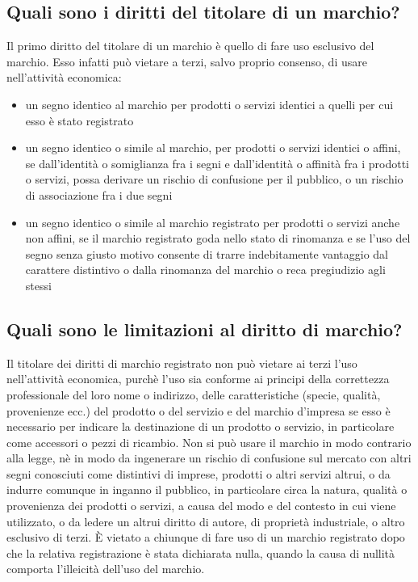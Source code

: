 \subsection{Quali sono i diritti del titolare di un marchio?}
Il primo diritto del titolare di un marchio è quello di fare uso esclusivo del marchio. Esso infatti può vietare a terzi, salvo
proprio consenso, di usare nell'attività economica:
\begin{itemize}
    \item un segno identico al marchio per prodotti o servizi identici a quelli per cui esso è stato registrato
    \item un segno identico o simile al marchio, per prodotti o servizi identici o affini, se dall'identità o somiglianza
    fra i segni e dall'identità o affinità fra i prodotti o servizi, possa derivare un rischio di confusione per il pubblico,
    o un rischio di associazione fra i due segni
    \item un segno identico o simile al marchio registrato per prodotti o servizi anche non affini, se il marchio registrato
    goda nello stato di rinomanza e se l'uso del segno senza giusto motivo consente di trarre indebitamente vantaggio dal carattere
    distintivo o dalla rinomanza del marchio o reca pregiudizio agli stessi
\end{itemize}

\subsection{Quali sono le limitazioni al diritto di marchio?}
Il titolare dei diritti di marchio registrato non può vietare ai terzi l'uso nell'attività economica, purchè l'uso sia conforme ai principi
della correttezza professionale del loro nome o indirizzo, delle caratteristiche (specie, qualità, provenienze ecc.) del prodotto o del servizio e del marchio
d'impresa se esso è necessario per indicare la destinazione di un prodotto o servizio, in particolare come accessori o pezzi di ricambio. \newline
Non si può usare il marchio in modo contrario alla legge, nè in modo da ingenerare un rischio di confusione sul mercato con altri segni
conosciuti come distintivi di imprese, prodotti o altri servizi altrui, o da indurre comunque in inganno il pubblico, in particolare circa la natura,
qualità o provenienza dei prodotti o servizi, a causa del modo e del contesto in cui viene utilizzato, o da ledere un altrui diritto di autore,
di proprietà industriale, o altro esclusivo di terzi. \newline
È vietato a chiunque di fare uso di un marchio registrato dopo che la relativa registrazione è stata dichiarata nulla,
quando la causa di nullità comporta l'illeicità dell'uso del marchio.

